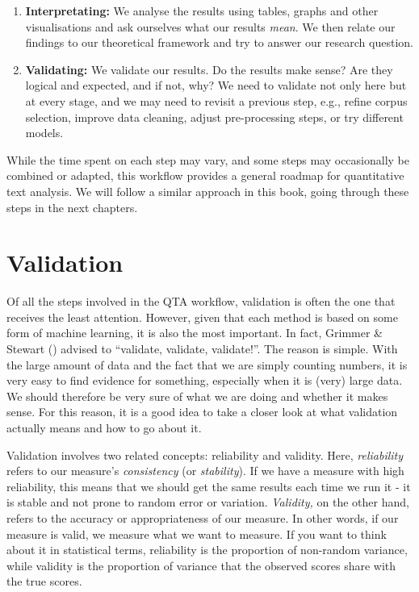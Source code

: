 \documentclass[
]{book}
\begin{document}
\begin{enumerate}
\item
  \textbf{Interpretating:} We analyse the results using tables, graphs and other visualisations and ask ourselves what our results \emph{mean}. We then relate our findings to our theoretical framework and try to answer our research question.
\item
  \textbf{Validating:} We validate our results. Do the results make sense? Are they logical and expected, and if not, why? We need to validate not only here but at every stage, and we may need to revisit a previous step, e.g., refine corpus selection, improve data cleaning, adjust pre-processing steps, or try different models.
\end{enumerate}

While the time spent on each step may vary, and some steps may occasionally be combined or adapted, this workflow provides a general roadmap for quantitative text analysis. We will follow a similar approach in this book, going through these steps in the next chapters.

\section{Validation}\label{validation}

Of all the steps involved in the QTA workflow, validation is often the one that receives the least attention. However, given that each method is based on some form of machine learning, it is also the most important. In fact, Grimmer \& Stewart () advised to ``validate, validate, validate!''. The reason is simple. With the large amount of data and the fact that we are simply counting numbers, it is very easy to find evidence for something, especially when it is (very) large data. We should therefore be very sure of what we are doing and whether it makes sense. For this reason, it is a good idea to take a closer look at what validation actually means and how to go about it.

Validation involves two related concepts: reliability and validity. Here, \emph{reliability} refers to our measure's \emph{consistency} (or \emph{stability}). If we have a measure with high reliability, this means that we should get the same results each time we run it - it is stable and not prone to random error or variation. \emph{Validity,} on the other hand, refers to the accuracy or appropriateness of our measure. In other words, if our measure is valid, we measure what we want to measure. If you want to think about it in statistical terms, reliability is the proportion of non-random variance, while validity is the proportion of variance that the observed scores share with the true scores.
\end{document}
